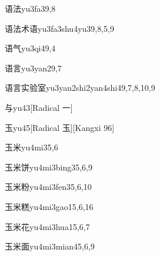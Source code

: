 \begin{entry}{语法}{yu3fa3}{9,8}
\end{entry}

\begin{entry}{语法术语}{yu3fa3shu4yu3}{9,8,5,9}
\end{entry}

\begin{entry}{语气}{yu3qi4}{9,4}
\end{entry}

\begin{entry}{语言}{yu3yan2}{9,7}
\end{entry}

\begin{entry}{语言实验室}{yu3yan2shi2yan4shi4}{9,7,8,10,9}
\end{entry}

\begin{entry}{与}{yu4}{3}[Radical 一]
\end{entry}

\begin{entry}{玉}{yu4}{5}[Radical 玉][Kangxi 96]
\end{entry}

\begin{entry}{玉米}{yu4mi3}{5,6}
\end{entry}

\begin{entry}{玉米饼}{yu4mi3bing3}{5,6,9}
\end{entry}

\begin{entry}{玉米粉}{yu4mi3fen3}{5,6,10}
\end{entry}

\begin{entry}{玉米糕}{yu4mi3gao1}{5,6,16}
\end{entry}

\begin{entry}{玉米花}{yu4mi3hua1}{5,6,7}
\end{entry}

\begin{entry}{玉米面}{yu4mi3mian4}{5,6,9}
\end{entry}

